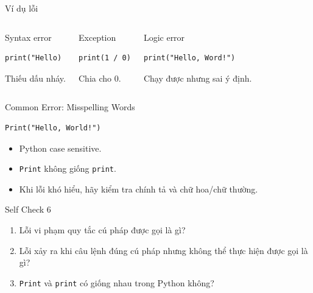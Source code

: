 \documentclass[aspectratio=169,10pt]{beamer}
\begin{document}
\begin{frame}[fragile]{Ví dụ lỗi}
\small
\begin{columns}[T,onlytextwidth]
\begin{block}{Syntax error}
\begin{lstlisting}
print("Hello)
\end{lstlisting}
Thiếu dấu nháy.
\end{block}

\begin{block}{Exception}
\begin{lstlisting}
print(1 / 0)
\end{lstlisting}
Chia cho 0.
\end{block}

\begin{block}{Logic error}
\begin{lstlisting}
print("Hello, Word!")
\end{lstlisting}
Chạy được nhưng sai ý định.
\end{block}
\end{columns}
\end{frame}

\begin{frame}[fragile]{Common Error: Misspelling Words}
\begin{lstlisting}
Print("Hello, World!")
\end{lstlisting}

\begin{itemize}
  \item Python case sensitive.
  \item \texttt{Print} không giống \texttt{print}.
  \item Khi lỗi khó hiểu, hãy kiểm tra chính tả và chữ hoa/chữ thường.
\end{itemize}
\end{frame}

\begin{frame}{Self Check 6}
\begin{enumerate}
  \item Lỗi vi phạm quy tắc cú pháp được gọi là gì?
  \item Lỗi xảy ra khi câu lệnh đúng cú pháp nhưng không thể thực hiện được gọi là gì?
  \item \texttt{Print} và \texttt{print} có giống nhau trong Python không?
\end{enumerate}
\end{frame}
\end{document}
